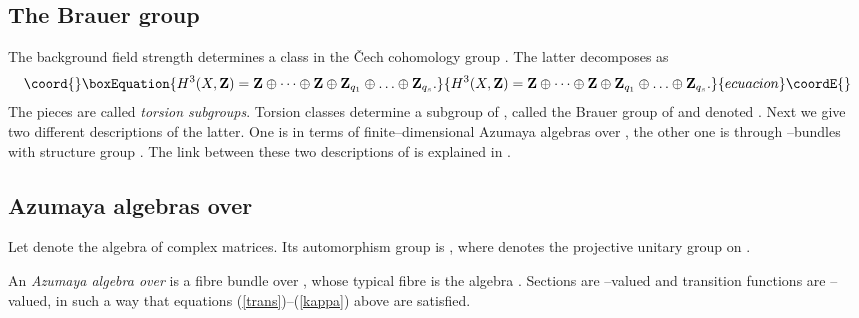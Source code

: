 \documentclass[a4paper,a4paper]{article}
\begin{document}
\subsection{The Brauer group}\label{bru}

The background field strength \coordHE{} determines a class in the  
\v Cech cohomology group \coordHE{} \cite{BOTT}.
The latter decomposes as   
\begin{equation}\coord{}\boxEquation{  
H^3(X,{\bf Z})={\bf Z} \oplus \dots \oplus {\bf Z} \oplus {\bf Z}_{q_1}   
\oplus \ldots \oplus {\bf Z}_{q_s}.  
\label{decomposes}
}{  
H^3(X,{\bf Z})={\bf Z} \oplus \dots \oplus {\bf Z} \oplus {\bf Z}_{q_1}   
\oplus \ldots \oplus {\bf Z}_{q_s}.  
}{ecuacion}\coordE{}\end{equation}  
The \coordHE{} pieces are called {\it torsion subgroups}.  
Torsion classes  determine a subgroup of \coordHE{}, 
called the Brauer group of \coordHE{} and denoted \coordHE{}. 
Next we give two different descriptions of the latter.   
One is in terms of finite--dimensional Azumaya algebras over \coordHE{},   
the other one is through \coordHE{}--bundles with structure  
group \coordHE{}.  The link between these two descriptions 
of \coordHE{} is explained in \cite{BOUWMATHAI}.   
 
\subsection{Azumaya algebras over \coordHE{}}\label{azumaya}  
  
Let \coordHE{} denote the algebra of complex \coordHE{} matrices.   
Its automorphism group \coordHE{} is  \coordHE{},   
where \coordHE{} denotes the projective unitary group on \coordHE{}.  
  
An {\it Azumaya algebra over \coordHE{}} is a fibre bundle over \coordHE{}, whose typical 
fibre is the algebra \coordHE{}. Sections \coordHE{} are \coordHE{}--valued 
and transition functions \coordHE{} are \coordHE{}--valued, in such a way that 
equations (\ref{trans})--(\ref{kappa}) above are satisfied.  
  
\end{document}
